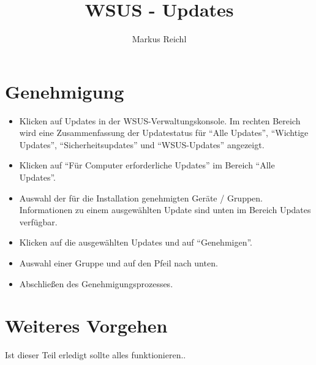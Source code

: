 \documentclass[a4paper,11pt]{article}
\title{WSUS - Updates}
\author{Markus Reichl}
\begin{document}
\maketitle

\section{Genehmigung}
\begin{itemize}
 \item Klicken auf Updates in der WSUS-Verwaltungskonsole. 
  \subitem Im rechten Bereich wird eine Zusammenfassung der Updatestatus für ``Alle Updates'', ``Wichtige Updates'', ``Sicherheitsupdates'' und ``WSUS-Updates'' angezeigt.
 \item Klicken auf ``Für Computer erforderliche Updates'' im Bereich ``Alle Updates''.
 \item Auswahl der für die Installation genehmigten Ger\"ate / Gruppen. 
  \subitem Informationen zu einem ausgewählten Update sind unten im Bereich Updates verfügbar.
 \item Klicken auf die ausgewählten Updates und auf ``Genehmigen''.
 \item Auswahl einer Gruppe und auf den Pfeil nach unten.
 \item Abschlie\ss{}en des Genehmigungsprozesses.
\end{itemize}

\section{Weiteres Vorgehen}
Ist dieser Teil erledigt sollte alles funktionieren..
\end{document}
